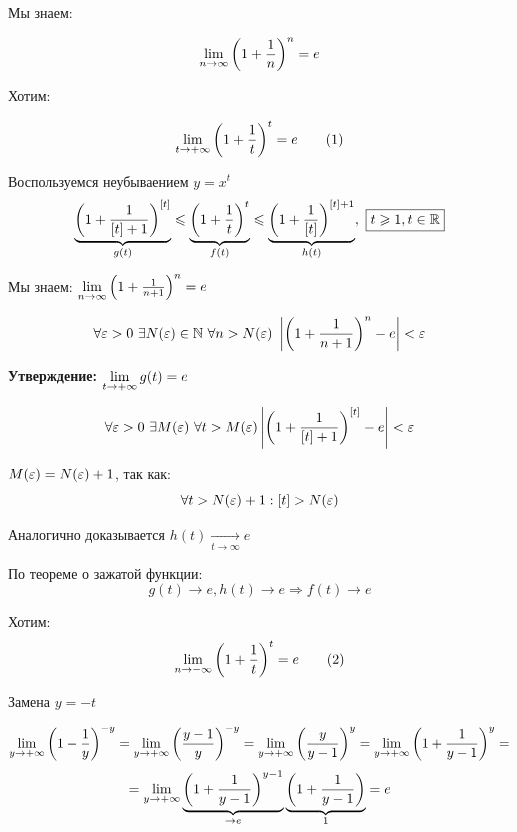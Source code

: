 \begin{Proof}
    Мы знаем:

    $$\lim\limits_{n \to \infty} \left(1 + \frac{1}{n}\right)^n = e$$

    Хотим:
    
    \[
    \lim\limits_{t \to +\infty} \left(1 + \frac{1}{t}\right)^t = e \tag{1}
    \]

    Воспользуемся неубываением $y = x^t$
    \[
        \underbrace{\left(1 + \frac{1}{[t] + 1} \right)^{[t]}}_{g(t)} \leqslant \underbrace{\left(1 + \frac{1}{t} \right)^{t}}_{f(t)} \leqslant \underbrace{\left(1 + \frac{1}{[t]} \right)^{[t] + 1}}_{h(t)},\ \fbox{$t \geqslant 1, t \in \mathbb{R}$}
    \]

    Мы знаем: $\lim\limits_{n \to \infty} \left(1 + \frac{1}{n + 1} \right)^{n} = e$

    \[
        \forall \varepsilon > 0\ \exists N(\varepsilon ) \in \mathbb{N}\ \forall n > N(\varepsilon )\ \left|\left(1 + \frac{1}{n + 1}\right)^n - e \right| < \varepsilon 
    \]

    {\bf Утверждение:} $\lim\limits_{t \to +\infty} g(t) = e$

    \[
        \forall \eps > 0\ \exists M(\eps )\ \forall t > M(\eps ) \l|\l(1 + \frac{1}{[t] + 1} \r)^{[t]} - e\r| < \eps
    \]

    $M(\varepsilon) = N(\varepsilon) + 1$, так как:
    \[
        \forall t > N(\varepsilon ) + 1 : [t] > N(\varepsilon )
    \]

    Аналогично доказывается $h(t) \xrightarrow[t \to \infty ]{} e$

    По теореме о зажатой функции:
    \[
        g(t) \to e, h(t) \to e \Rightarrow f(t) \to e
    \]
\end{Proof}
\begin{Proof}[]
    Хотим:
    \[
        \lim\limits_{n \to -\infty } \left( 1 + \frac{1}{t} \right)^t = e  \tag{2}
    \]

    Замена $y = -t$

    \[
        \lim\limits_{y \to +\infty } \left( 1 - \frac{1}{y} \right)^{-y} = \lim\limits_{y \to +\infty } \left(\frac{y - 1}{y} \right)^{-y} = \lim\limits_{y \to +\infty } \left(\frac{y}{y-1} \right)^{y} = \lim\limits_{y \to +\infty } \left(1 + \frac{1}{y - 1} \right)^{y} =
    \]
    \[
        = \lim\limits_{y \to +\infty } \underbrace{\left(1 + \frac{1}{y - 1} \right)^{y - 1}}_{\to e} \underbrace{\left(1 + \frac{1}{y - 1} \right)}_{1} = e
    \]
\end{Proof}
